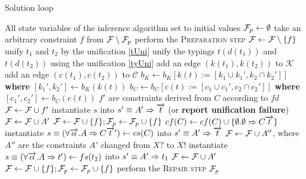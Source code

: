 \begin{algorithm}
    \small
    \caption{Solution loop}
    \label{main_loop}
    \begin{algorithmic}
        \Require All state variables of the inference algorithm set to initial values
        \State $\mathcal F_p \gets \emptyset$ 
            \State take an arbitrary constraint $f$ from $\mathcal F \setminus \mathcal F_p$
            \State perform the \textsc{Preparation step}
            \State $\mathcal F \gets \mathcal F \setminus \{f\}$ 
                \State unify $t_1$ and $t_2$ by the unification \ref{tUni}
                \State unify the typings $t (d (t_1))$ and $t (d (t_2))$ using the unification \ref{tyUni}
                \State add an edge $(k(t_1), k(t_2))$ to $\mathcal{K}$
                \State add an edge $(c(t_1), c(t_2))$ to $\mathcal{C}$
                \State $b_K \gets b_K[ k(t) := [k_1 \cup k_1', k_2 \cap k_2'] ]$ \textbf{where} $[k_1', k_2'] \gets b_K(k(t))$
                \State $b_C \gets b_C[ c(t) := [c_1 \cup c_1', c_2 \cap c_2'] ]$ \textbf{where} $[c_1', c_2'] \gets b_C(c(t))$
                    \State $f'$ are constraints derived from $C$ according to $fd$
                    \State $\mathcal F \gets \mathcal F \cup f'$
                    \State instantiate $s$ into $s' \equiv A' \Rightarrow \overrightarrow{t}$ (or \textbf{report unification failure})
                    \State $\mathcal F \gets \mathcal F \cup A'$
                \Else
                    \State $\mathcal F \gets \mathcal F \cup \{f\}; \mathcal F_p \gets \mathcal F_p \cup \{f\}$ 
                \EndIf
                \State $cf(C) \gets cf(C) \cup \{\emptyset . \emptyset \Rightarrow C \overrightarrow{t}\} $
                \State instantiate $s \equiv (\forall \overrightarrow{\alpha} . A \Rightarrow C \overrightarrow{t}') \gets cs(C)$ into $s' \equiv A' \Rightarrow \overrightarrow{t}$
                \State $\mathcal F \gets \mathcal F \cup A''$, where $A''$ are the constraints $A'$ changed from $X?$ to $X!$
                    \State instantiate $s \equiv (\forall \overrightarrow{\alpha} . A \Rightarrow t') \gets fs(t_2)$ into $s' \equiv A' \Rightarrow t_1$
                    \State $\mathcal F \gets \mathcal F \cup A'$
                \Else
                    \State $ \mathcal F \gets \mathcal F \cup \{f\}; \mathcal F_p \gets \mathcal F_p \cup \{f\}$ 
                \EndIf
            \EndIf
            \State perform the \textsc{Repair step}
        \EndWhile
        \State \Return $\mathcal F_p$
    \end{algorithmic}
\end{algorithm}

